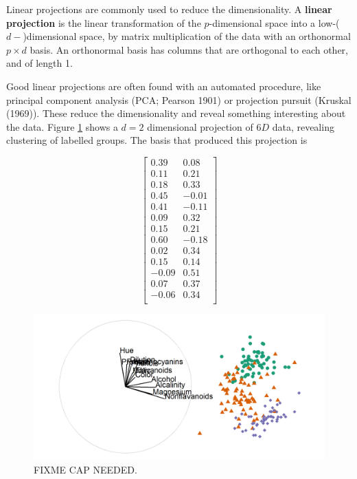 \documentclass[11,]{article}
\begin{document}
Linear projections are commonly used to reduce the dimensionality. A \textbf{linear projection} is the linear transformation of the \(p\)-dimensional space into a low-(\(d-\))dimensional space, by matrix multiplication of the data with an orthonormal \(p\times d\) basis. An orthonormal basis has columns that are orthogonal to each other, and of length 1.

Good linear projections are often found with an automated procedure, like principal component analysis (PCA; Pearson 1901) or projection pursuit (Kruskal (1969)). These reduce the dimensionality and reveal something interesting about the data. Figure \ref{fig:basis} shows a \(d=2\) dimensional projection of \(6D\) data, revealing clustering of labelled groups. The basis that produced this projection is

\begin{equation*}
\left[ \begin{array}{rr}
 0.39 &  0.08 \\
 0.11 &  0.21 \\
 0.18 &  0.33 \\
 0.45 & -0.01 \\
 0.41 & -0.11 \\
 0.09 &  0.32 \\
 0.15 &  0.21 \\
 0.60 & -0.18 \\
 0.02 &  0.34 \\
 0.15 &  0.14 \\
-0.09 &  0.51 \\
 0.07 &  0.37 \\
-0.06 &  0.34 \\
\end{array} \right]
\end{equation*}

\begin{figure}[h]

{\centering \includegraphics[width=1\linewidth,]{./figures/basisWINE} 

}

\caption{FIXME CAP NEEDED.}\label{fig:basis}
\end{figure}
\end{document}
